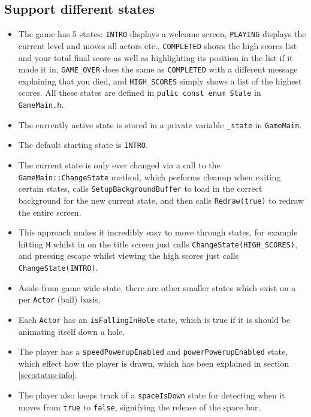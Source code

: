\subsection{Support different states}

\begin{itemize}
	\item The game has 5 states: \verb!INTRO! displays a welcome screen, \verb!PLAYING! displays the current level and moves all actors etc., \verb!COMPLETED! shows the high scores list and your total final score as well as highlighting its position in the list if it made it in, \verb!GAME_OVER! does the same as \verb!COMPLETED! with a different message explaining that you died, and \verb!HIGH_SCORES! simply shows a list of the highest scores. All these states are defined in \verb!pulic const enum State! in \verb!GameMain.h!.
	\item The currently active state is stored in a private variable \verb!_state! in \verb!GameMain!.
	\item The default starting state is \verb!INTRO!.
	\item The current state is only ever changed via a call to the \verb!GameMain::ChangeState! method, which performs cleanup when exiting certain states, calls \verb!SetupBackgroundBuffer! to load in the correct background for the new current state, and then calls \verb!Redraw(true)! to redraw the entire screen.
	\item This approach makes it incredibly easy to move through states, for example hitting \verb!H! whilst in on the title screen just calls \verb!ChangeState(HIGH_SCORES)!, and pressing escape whilst viewing the high scores just calls \verb!ChangeState(INTRO)!.
	\item Aside from game wide state, there are other smaller states which exist on a per \verb!Actor! (ball) basis.
	\item Each \verb!Actor! has an \verb!isFallingInHole! state, which is true if it is should be animating itself down a hole.
	\item The player has a \verb!speedPowerupEnabled! and \verb!powerPowerupEnabled! state, which effect how the player is drawn, which has been explained in section \ref{sec:status-info}.
	\item The player also keeps track of a \verb!spaceIsDown! state for detecting when it moves from \verb!true! to \verb!false!, signifying the release of the space bar.
\end{itemize}